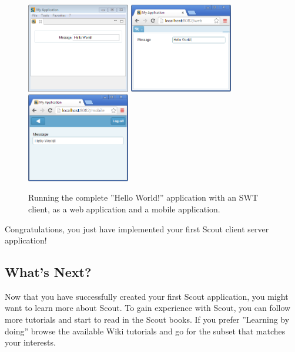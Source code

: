 \documentclass{article}
\begin{document}
\begin{figure}
\includegraphics[width=4.5cm]{helloworld_swt.png} \hspace{3mm}
\includegraphics[width=4.5cm]{helloworld_web.png} \hspace{3mm}
\includegraphics[width=4.5cm]{helloworld_mobile.png}
\caption{Running the complete ''Hello World!'' application with an SWT client, as a web application and a mobile application.}
\end{figure}

Congratulations, you just have implemented your first Scout client server application!

\subsection*{What's Next?}

Now that you have successfully created your first Scout application, you might want to learn more about Scout. 
To gain experience with Scout, you can follow more tutorials and start to read in the Scout books.
If you prefer ''Learning by doing'' browse the available Wiki tutorials and go for the subset that matches your interests.
\end{document}
